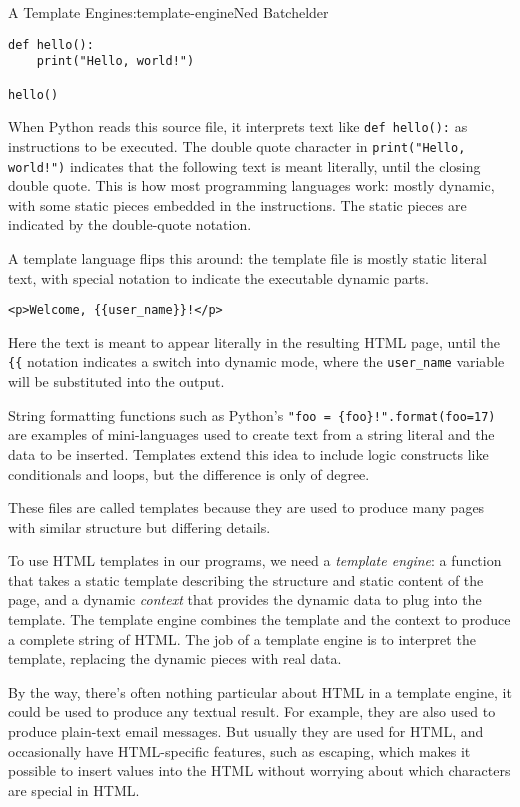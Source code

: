 \begin{aosachapter}{A Template Engine}{s:template-engine}{Ned Batchelder}
\begin{verbatim}
def hello():
    print("Hello, world!")

hello()
\end{verbatim}

When Python reads this source file, it interprets text like
\texttt{def hello():} as instructions to be executed. The double quote
character in \texttt{print("Hello, world!")} indicates that the
following text is meant literally, until the closing double quote. This
is how most programming languages work: mostly dynamic, with some static
pieces embedded in the instructions. The static pieces are indicated by
the double-quote notation.

A template language flips this around: the template file is mostly
static literal text, with special notation to indicate the executable
dynamic parts.

\begin{verbatim}
<p>Welcome, {{user_name}}!</p>
\end{verbatim}

Here the text is meant to appear literally in the resulting HTML page,
until the \texttt{\{\{} notation indicates a switch into dynamic mode,
where the \texttt{user\_name} variable will be substituted into the
output.

String formatting functions such as Python's
\texttt{"foo = \{foo\}!".format(foo=17)} are examples of mini-languages
used to create text from a string literal and the data to be inserted.
Templates extend this idea to include logic constructs like conditionals
and loops, but the difference is only of degree.

These files are called templates because they are used to produce many
pages with similar structure but differing details.

To use HTML templates in our programs, we need a \emph{template engine}:
a function that takes a static template describing the structure and
static content of the page, and a dynamic \emph{context} that provides
the dynamic data to plug into the template. The template engine combines
the template and the context to produce a complete string of HTML. The
job of a template engine is to interpret the template, replacing the
dynamic pieces with real data.

By the way, there's often nothing particular about HTML in a template
engine, it could be used to produce any textual result. For example,
they are also used to produce plain-text email messages. But usually
they are used for HTML, and occasionally have HTML-specific features,
such as escaping, which makes it possible to insert values into the HTML
without worrying about which characters are special in HTML.


\end{aosachapter}
